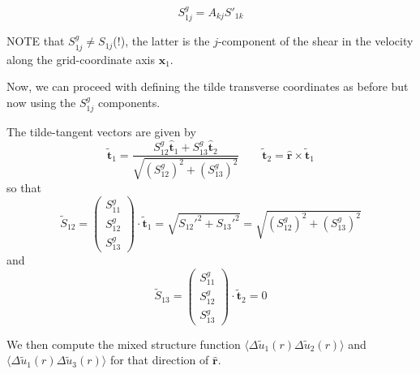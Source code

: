 \documentclass[12pt]{article}
\begin{document}
$$S^g_{1j}  =  A_{kj} S'_{1k}$$

NOTE that $S^g_{1j} \neq S_{1j}$(!), the latter is the $j$-component
of the shear in the velocity along the grid-coordinate axis
$\bm{x}_1$.  

Now, we can proceed with defining the tilde transverse coordinates as before but now using the $S^g_{1j}$ components.
 
The tilde-tangent vectors are given by 
\[
\bm{{\tilde t}}_1 = \frac{S^g_{12}  \bm{{\hat t}}_1 +  S^g_{13}  \bm{{\hat t}}_2 }
                         {\sqrt{ (S^g_{12})^2 +  (S^g_{13})^2 }}
\qquad
\bm{{\tilde t}}_2 = \bm{{\hat r}} \times \bm{{\tilde t}}_1
\]
so that
\[
\tilde S_{12} = 
\begin{pmatrix}  S^g_{11} \\
                 S^g_{12} \\
                 S^g_{13} 
\end{pmatrix}
\cdot \bm{{\tilde t}}_1 = 
 \sqrt{ S_{12}'^2 + S_{13}'^2 } =  \sqrt{ (S^g_{12})^2 + (S^g_{13})^2 }
\]
and 
\[
\tilde S_{13} = 
\begin{pmatrix}  S^g_{11} \\
                 S^g_{12} \\
                 S^g_{13} 
\end{pmatrix}
\cdot \bm{{\tilde t}}_2 =  0
\]


We then compute the mixed structure function $\langle \Delta \tilde u_1 (r) 
\Delta \tilde u_2 (r)\rangle$ and 
$\langle \Delta \tilde u_1 (r) \Delta \tilde u_3 (r)\rangle$ for that direction of $\bm{{\hat r}}$.
\end{document}

